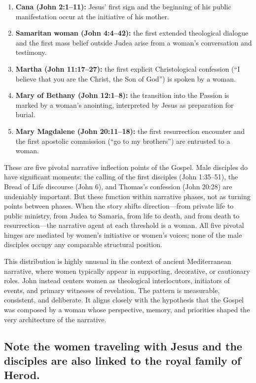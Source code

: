 \begin{enumerate}
\item \textbf{Cana (John 2:1--11):} Jesus' first sign and the beginning of his public manifestation occur at the initiative of his mother.

\item \textbf{Samaritan woman (John 4:4--42):} the first extended theological dialogue and the first mass belief outside Judea arise from a woman's conversation and testimony.

\item \textbf{Martha (John 11:17--27):} the first explicit Christological confession (``I believe that you are the Christ, the Son of God'') is spoken by a woman.

\item \textbf{Mary of Bethany (John 12:1--8):} the transition into the Passion is marked by a woman's anointing, interpreted by Jesus as preparation for burial.

\item \textbf{Mary Magdalene (John 20:11--18):} the first resurrection encounter and the first apostolic commission (``go to my brothers'') are entrusted to a woman.
\end{enumerate}

These are five pivotal narrative inflection points of the Gospel.
Male disciples do have significant moments: the calling of the first disciples (John 1:35--51), the Bread of Life discourse (John 6), and Thomas's confession (John 20:28) are undeniably important.
But these function within narrative phases, not as turning points between phases.
When the story shifts direction---from private life to public ministry, from Judea to Samaria, from life to death, and from death to resurrection---the narrative agent at each threshold is a woman.
All five pivotal hinges are mediated by women's initiative or women's voices; none of the male disciples occupy any comparable structural position.

This distribution is highly unusual in the context of ancient Mediterranean narrative, where women typically appear in supporting, decorative, or cautionary roles.
John instead centers women as theological interlocutors, initiators of events, and primary witnesses of revelation.
The pattern is measurable, consistent, and deliberate.
It aligns closely with the hypothesis that the Gospel was composed by a woman whose perspective, memory, and priorities shaped the very architecture of the narrative.

\subsection{Note the women traveling with Jesus and the disciples are also linked to the royal family of Herod.}\label{subsec:note-the-women-traveling-with-jesus-and-the-disciples-are-also-linked-to-the-royal-family-of-herod.}

